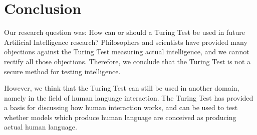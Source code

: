 \section{Conclusion}
Our research question was: How can or should a Turing Test be used in future Artificial Intelligence research? Philosophers and scientists have provided many objections against the Turing Test measuring actual intelligence, and we cannot rectify all those objections. Therefore, we conclude that the Turing Test is not a secure method for testing intelligence.

However, we think that the Turing Test can still be used in another domain, namely in the field of human language interaction. The Turing Test has provided a basis for discussing how human interaction works, and can be used to test whether models which produce human language are conceived as producing actual human language.
